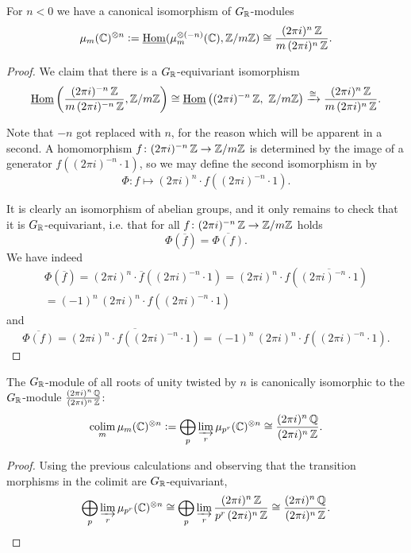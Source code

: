 \begin{lemma}
  \label{lemma:roots-of-unity-GR-equiv}
  For $n < 0$ we have a canonical isomorphism of $G_{\mathbb{R}}$-modules
  \[ \mu_m (\mathbb{C})^{\otimes n} \mathrel{\mathop:}=
    \underline{\operatorname{Hom}} (\mu_m^{\otimes (-n)} (\mathbb{C}), \mathbb{Z}/m\mathbb{Z}) \cong
    \frac{(2\pi i)^n \, \mathbb{Z}}{m \, (2\pi i)^n \, \mathbb{Z}}. \]

  \begin{proof}
    We claim that there is a $G_{\mathbb{R}}$-equivariant isomorphism
    \begin{equation}
      \label{eqn:dual-conjugation}
      \underline{\operatorname{Hom}} \left(\frac{(2\pi i)^{-n}\,\mathbb{Z}}{m \, (2\pi i)^{-n}\,\mathbb{Z}}, \mathbb{Z}/m \mathbb{Z}\right) \cong
      \underline{\operatorname{Hom}} \left((2\pi i)^{-n}\,\mathbb{Z}, ~ \mathbb{Z}/m \mathbb{Z}\right) \xrightarrow{\cong}
      \frac{(2\pi i)^n\,\mathbb{Z}}{m \, (2\pi i)^n\,\mathbb{Z}}.
    \end{equation}

    Note that $-n$ got replaced with $n$, for the reason which will be apparent
    in a second. A homomorphism $f\colon (2\pi i)^{-n}\,\mathbb{Z} \to \mathbb{Z}/m \mathbb{Z}$ is
    determined by the image of a generator $f ((2\pi i)^{-n}\cdot 1)$, so we may
    define the second isomorphism in  by
    \begin{equation}
      \label{eqn:dual-conjugation-dfn}
      \Phi\colon f \mapsto (2\pi i)^n \cdot f ((2\pi i)^{-n}\cdot 1).
    \end{equation}

    It is clearly an isomorphism of abelian groups, and it only remains to check
    that it is $G_{\mathbb{R}}$-equivariant, i.e. that for all
    $f\colon (2\pi i)^{-n}\,\mathbb{Z} \to \mathbb{Z}/m \mathbb{Z}$ holds
    $$\Phi (\overline{f}) = \overline{\Phi (f)}.$$
    We have indeed
    \begin{multline*} \Phi (\overline{f}) = (2\pi i)^n \cdot \overline{f} ((2\pi i)^{-n}\cdot 1) = (2\pi i)^n \cdot f (\overline{(2\pi i)^{-n}\cdot 1}) \\
      = (-1)^n \, (2\pi i)^n \cdot f ((2\pi i)^{-n}\cdot 1)
    \end{multline*}
    and
    \[ \overline{\Phi (f)} =
      \overline{(2\pi i)^n \cdot f ((2\pi i)^{-n}\cdot 1)} =
      (-1)^n \, (2\pi i)^n \cdot f ((2\pi i)^{-n}\cdot 1). \]
  \end{proof}
\end{lemma}

\begin{lemma}
  \label{lemma:all-roots-of-unity-as-QZ}
  The $G_{\mathbb{R}}$-module of all roots of unity twisted by $n$ is canonically
  isomorphic to the $G_{\mathbb{R}}$-module $\frac{(2\pi i)^n\,\mathbb{Q}}{(2\pi i)^n\,\mathbb{Z}}$:
  \[ \operatorname*{co{\lim}}_m \mu_m (\mathbb{C})^{\otimes n} \mathrel{\mathop:}=
    \bigoplus_p \varinjlim_r \mu_{p^r} (\mathbb{C})^{\otimes n} \cong
    \frac{(2\pi i)^n\,\mathbb{Q}}{(2\pi i)^n\,\mathbb{Z}}. \]

  \begin{proof}
    Using the previous calculations and observing that the transition morphisms
    in the colimit are $G_{\mathbb{R}}$-equivariant,
    \[ \bigoplus_p \varinjlim_r \mu_{p^r} (\mathbb{C})^{\otimes n} \cong
      \bigoplus_p \varinjlim_r \frac{(2\pi i)^n\,\mathbb{Z}}{p^r\,(2\pi i)^n\,\mathbb{Z}} \cong
      \frac{(2\pi i)^n\,\mathbb{Q}}{(2\pi i)^n\,\mathbb{Z}}. \]
  \end{proof}
\end{lemma}

